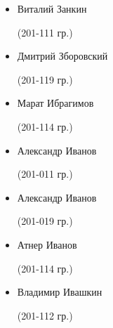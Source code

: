 \begin{multicols}{2}
\begin{small}
\begin{itemize}[leftmargin=*]
	\item[] Виталий Занкин\begin{tiny} (201-111 гр.)\end{tiny} %
	\item[] Дмитрий Зборовский\begin{tiny} (201-119 гр.)\end{tiny}

	\item[] Марат Ибрагимов\begin{tiny} (201-114 гр.)\end{tiny}
	\item[] Александр Иванов\begin{tiny} (201-011 гр.)\end{tiny}
	\item[] Александр Иванов\begin{tiny} (201-019 гр.)\end{tiny}
	\item[] Атнер Иванов\begin{tiny} (201-114 гр.)\end{tiny}
	\item[] Владимир Ивашкин\begin{tiny} (201-112 гр.)\end{tiny}


\end{itemize}
\end{small}
\end{multicols}
